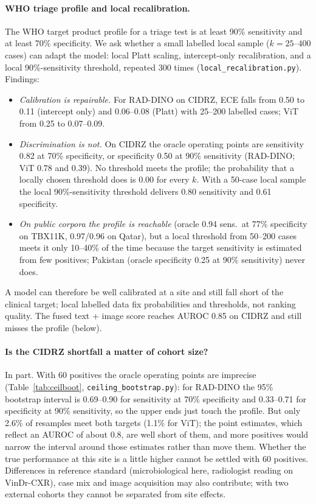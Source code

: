 \documentclass[10pt,a4paper]{article}
\begin{document}
\paragraph{WHO triage profile and local recalibration.} The WHO target product profile for a triage test is at least 90\% sensitivity and at least 70\% specificity. We ask whether a small labelled local sample ($k=25$--$400$ cases) can adapt the model: local Platt scaling, intercept-only recalibration, and a local 90\%-sensitivity threshold, repeated 300 times (\texttt{local\_recalibration.py}). Findings:
\begin{itemize}
\item \emph{Calibration is repairable.} For RAD-DINO on CIDRZ, ECE falls from 0.50 to 0.11 (intercept only) and 0.06--0.08 (Platt) with 25--200 labelled cases; ViT from 0.25 to 0.07--0.09.
\item \emph{Discrimination is not.} On CIDRZ the oracle operating points are sensitivity 0.82 at 70\% specificity, or specificity 0.50 at 90\% sensitivity (RAD-DINO; ViT 0.78 and 0.39). No threshold meets the profile; the probability that a locally chosen threshold does is 0.00 for every $k$. With a 50-case local sample the local 90\%-sensitivity threshold delivers 0.80 sensitivity and 0.61 specificity.
\item \emph{On public corpora the profile is reachable} (oracle 0.94 sens.\ at 77\% specificity on TBX11K, 0.97/0.96 on Qatar), but a local threshold from 50--200 cases meets it only 10--40\% of the time because the target sensitivity is estimated from few positives; Pakistan (oracle specificity 0.25 at 90\% sensitivity) never does.
\end{itemize}
A model can therefore be well calibrated at a site and still fall short of the clinical target; local labelled data fix probabilities and thresholds, not ranking quality. The fused text + image score reaches AUROC 0.85 on CIDRZ and still misses the profile (below).

\paragraph{Is the CIDRZ shortfall a matter of cohort size?}\label{sec:why-cidrz} In part. With 60 positives the oracle operating points are imprecise (Table~\ref{tab:ceilboot}, \texttt{ceiling\_bootstrap.py}): for RAD-DINO the 95\% bootstrap interval is 0.69--0.90 for sensitivity at 70\% specificity and 0.33--0.71 for specificity at 90\% sensitivity, so the upper ends just touch the profile. But only 2.6\% of resamples meet both targets (1.1\% for ViT); the point estimates, which reflect an AUROC of about 0.8, are well short of them, and more positives would narrow the interval around those estimates rather than move them. Whether the true performance at this site is a little higher cannot be settled with 60 positives. Differences in reference standard (microbiological here, radiologist reading on VinDr-CXR), case mix and image acquisition may also contribute; with two external cohorts they cannot be separated from site effects.
\end{document}
